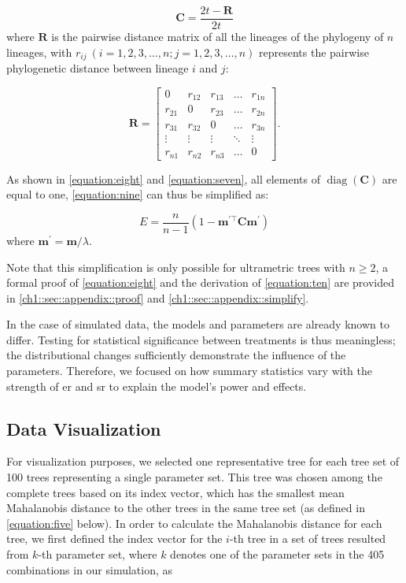 {\begin{equation}
    \boldsymbol{C} = \frac{2t - \boldsymbol{R}}{2t}
\label{equation:eight}
\end{equation}
where $\boldsymbol{R}$ is the pairwise distance matrix of all the lineages of the phylogeny of $n$ lineages, with $r_{ij}\ (i=1,2,3,\ldots,n;j=1,2,3,\ldots,n)$ represents the pairwise phylogenetic distance between lineage $i$ and $j$:

\begin{equation}
    \boldsymbol{R}=	\begin{bmatrix} 
	0 & r_{12} & r_{13} &  \ldots & r_{1n}  \\
	r_{21} & 0 & r_{23} &  \ldots & r_{2n}  \\
	r_{31} & r_{32} & 0  & \ldots & r_{3n}  \\
    \vdots & \vdots & \vdots & \ddots & \vdots \\
    r_{n1} & r_{n2} & r_{n3} & \ldots & 0
    \end{bmatrix}.
\label{equation:seven}
\end{equation}

As shown in \autoref{equation:eight} and \autoref{equation:seven}, all elements of $\operatorname{diag}(\boldsymbol{C})$ are equal to one, \autoref{equation:nine} can thus be simplified as:

\begin{equation}
    E=\frac{n}{n-1}(1 - \boldsymbol{m}^{\prime\top}\boldsymbol{C}\boldsymbol{m}^{\prime})
    \label{equation:ten}
\end{equation}
where $\boldsymbol{m}^{\prime} = \boldsymbol{m} / \lambda$.

Note that this simplification is only possible for ultrametric trees with $n \geq 2$, a formal proof of \autoref{equation:eight} and the derivation of \autoref{equation:ten} are provided in \autoref{ch1::sec::appendix::proof} and \autoref{ch1::sec::appendix::simplify}.

In the case of simulated data, the models and parameters are already known to differ. Testing for statistical significance between treatments is thus meaningless; the distributional changes sufficiently demonstrate the influence of the parameters. Therefore, we focused on how summary statistics vary with the strength of \acrshort{er} and \acrshort{sr} to explain the model's power and effects.

\subsection{Data Visualization}
\label{ch1::sec::methods::data_visualization}
For visualization purposes, we selected one representative tree for each tree set of 100 trees representing a single parameter set. This tree was chosen among the complete trees based on its index vector, which has the smallest mean Mahalanobis distance \citep{de_maesschalck_mahalanobis_2000} to the other trees in the same tree set (as defined in \autoref{equation:five} below). 
In order to calculate the Mahalanobis distance for each tree, we first defined the index vector for the $i$-th tree in a set of trees resulted from $k$-th parameter set, where $k$ denotes one of the parameter sets in the 405 combinations in our simulation, as

}
